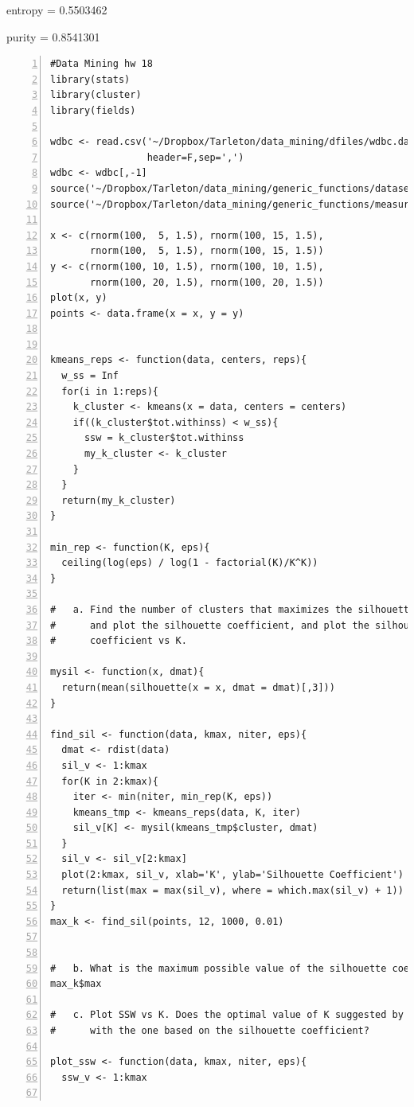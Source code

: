 \documentclass[11pt]{article}
\begin{document}
\begin{enumerate}
entropy = 0.5503462

purity = 0.8541301

\end{enumerate}
\singlespace
\begin{Verbatim}[numbers=left]
#Data Mining hw 18
library(stats)
library(cluster)
library(fields)

wdbc <- read.csv('~/Dropbox/Tarleton/data_mining/dfiles/wdbc.data',
                 header=F,sep=',')
wdbc <- wdbc[,-1]
source('~/Dropbox/Tarleton/data_mining/generic_functions/dataset_ops.R')
source('~/Dropbox/Tarleton/data_mining/generic_functions/measures.R')

x <- c(rnorm(100,  5, 1.5), rnorm(100, 15, 1.5), 
       rnorm(100,  5, 1.5), rnorm(100, 15, 1.5))
y <- c(rnorm(100, 10, 1.5), rnorm(100, 10, 1.5), 
       rnorm(100, 20, 1.5), rnorm(100, 20, 1.5))
plot(x, y)
points <- data.frame(x = x, y = y)


kmeans_reps <- function(data, centers, reps){
  w_ss = Inf
  for(i in 1:reps){
    k_cluster <- kmeans(x = data, centers = centers)
    if((k_cluster$tot.withinss) < w_ss){
      ssw = k_cluster$tot.withinss
      my_k_cluster <- k_cluster
    }
  }
  return(my_k_cluster)
}

min_rep <- function(K, eps){
  ceiling(log(eps) / log(1 - factorial(K)/K^K))
}

#   a. Find the number of clusters that maximizes the silhouette coefficient, 
#      and plot the silhouette coefficient, and plot the silhouette 
#      coefficient vs K. 

mysil <- function(x, dmat){
  return(mean(silhouette(x = x, dmat = dmat)[,3]))
}

find_sil <- function(data, kmax, niter, eps){
  dmat <- rdist(data)
  sil_v <- 1:kmax
  for(K in 2:kmax){
  	iter <- min(niter, min_rep(K, eps))
  	kmeans_tmp <- kmeans_reps(data, K, iter)
  	sil_v[K] <- mysil(kmeans_tmp$cluster, dmat)
  }
  sil_v <- sil_v[2:kmax]
  plot(2:kmax, sil_v, xlab='K', ylab='Silhouette Coefficient')
  return(list(max = max(sil_v), where = which.max(sil_v) + 1))
}
max_k <- find_sil(points, 12, 1000, 0.01)


#   b. What is the maximum possible value of the silhouette coefficient? 
max_k$max

#   c. Plot SSW vs K. Does the optimal value of K suggested by this plot agree 
#      with the one based on the silhouette coefficient? 

plot_ssw <- function(data, kmax, niter, eps){
  ssw_v <- 1:kmax
  

\end{Verbatim}
\end{document}
